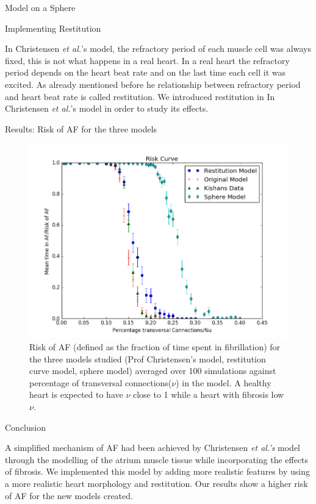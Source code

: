 \documentclass[final,hyperref={pdfpagelabels=false}]{beamer}
\begin{document}
\begin{frame}[t]
\begin{columns}[t]
\begin{column}{.465\textwidth}
\begin{block}{Model on a Sphere}
\end{block}

\begin{block}{Implementing Restitution }

In Christensen \emph{et al.}'s model, the refractory period of each muscle cell was always fixed, this is not what happens in a real heart.
In a real heart the refractory period depends on the heart beat rate and on the last time each cell it was excited. As already mentioned before he relationship between refractory period and heart beat rate is called restitution. We introduced restitution in In Christensen \emph{et al.}'s model in order to study its effects.
\end{block}


\begin{block}{Results: Risk of AF for the three models}

\begin{figure}
\includegraphics[width=0.65\linewidth]{xriskcurvesphere}
\caption{Risk of AF (defined as the fraction of time spent in fibrillation) for the three models studied (Prof Christensen's model, restitution curve model, sphere model) averaged over 100 simulations against percentage of transversal connections($\nu$) in the model. A healthy heart is expected to have $\nu$ close to 1 while a heart with fibrosis low $\nu$.}
\end{figure}

\end{block}


\begin{block}{Conclusion}

A simplified mechanism of AF had been achieved by Christensen \emph{et al.'s} model through the modelling of the atrium muscle tissue while incorporating the effects of fibrosis. We implemented this model by adding more realistic features by using a more realistic heart morphology and restitution. Our results show a higher risk of AF for the new models created.


\end{block}
\end{column}
\end{columns}
\end{frame}
\end{document}
